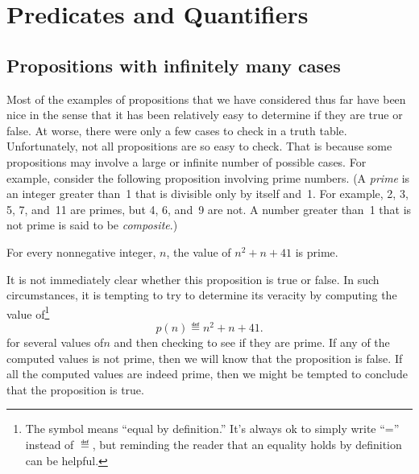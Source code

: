 \begin{problems}
\classproblems
{}

\homeworkproblems
{}

\end{problems}

\begin{problems}
\classproblems
{}

\end{problems}


\section{Predicates and Quantifiers}\label{pred_sec}

\subsection{Propositions with infinitely many cases}

Most of the examples of propositions that we have considered thus far
have been nice in the sense that it has been relatively easy to
determine if they are true or false.  At worse, there were only a few
cases to check in a truth table.  Unfortunately, not all propositions
are so easy to check.  That is because some propositions may involve a
large or infinite number of possible cases.  For example, consider the
following proposition involving prime numbers.  (A \emph{prime} is an
integer greater than~1 that is divisible only by itself and~1.  For
example, 2, 3, 5, 7, and~11 are primes, but 4, 6, and~9 are not.  A
number greater than~1 that is not prime is said to be
\emph{composite}.)
\begin{proposition}\label{41form}
For every nonnegative integer, $n$, the value of $n^2 + n + 41$ is prime.
\end{proposition}
It is not immediately clear whether this proposition is true or
false.  In such circumstances, it is tempting to try to determine its
veracity by computing the value of\footnote{The symbol \term{$\eqdef$} means
 ``equal by definition.''  It's always ok to simply write ``='' instead of
 $\eqdef$, but reminding the reader that an equality holds by definition
 can be helpful.}
\begin{equation}\label{pn41}
p(n) \eqdef  n^2 + n + 41.
\end{equation}
for several values of$n$ and then checking to see if they are prime.
If any of the computed values is not prime, then we will know that the
proposition is false.  If all the computed values are indeed prime,
then we might be tempted to conclude that the proposition is true.

